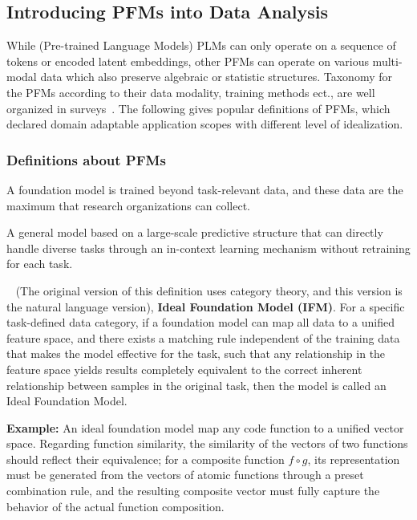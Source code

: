   \subsection{Introducing PFMs into Data Analysis} %
  
  While (Pre-trained Language Models) PLMs can only operate on a sequence of tokens or encoded latent embeddings, other PFMs can operate on various multi-modal data which also preserve algebraic or statistic structures. Taxonomy for the PFMs according to their data modality, training methods ect., are well organized in surveys~\cite{YangJTHFJZYH24,zhou2023comprehensive,LiangWNJ0SPW24,videounderstanding,yin2023survey,wu2023multimodal}. The following gives popular definitions of PFMs, which declared domain adaptable application scopes with different level of idealization.

  \subsubsection{Definitions about PFMs}

  
\begin{definition}
    A foundation model is trained beyond task-relevant data, and these data are the maximum that research organizations can collect.
    \end{definition}
    
    \begin{definition}
    A general model based on a large-scale predictive structure that can directly handle diverse tasks through an in-context learning mechanism without retraining for each task.
    \end{definition}
    
    \begin{definition}~\cite{Yuan23a} (The original version of this definition uses category theory, and this version is the natural language version), \textbf{Ideal Foundation Model (IFM)}. For a specific task-defined data category, if a foundation model can map all data to a unified feature space, and there exists a matching rule independent of the training data that makes the model effective for the task, such that any relationship in the feature space yields results completely equivalent to the correct inherent relationship between samples in the original task, then the model is called an Ideal Foundation Model.
    
    \textbf{Example:} An ideal foundation model map any code function to a unified vector space. Regarding function similarity, the similarity of the vectors of two functions should reflect their equivalence; for a composite function $f\circ g$, its representation must be generated from the vectors of atomic functions through a preset combination rule, and the resulting composite vector must fully capture the behavior of the actual function composition.
    \end{definition}
    
